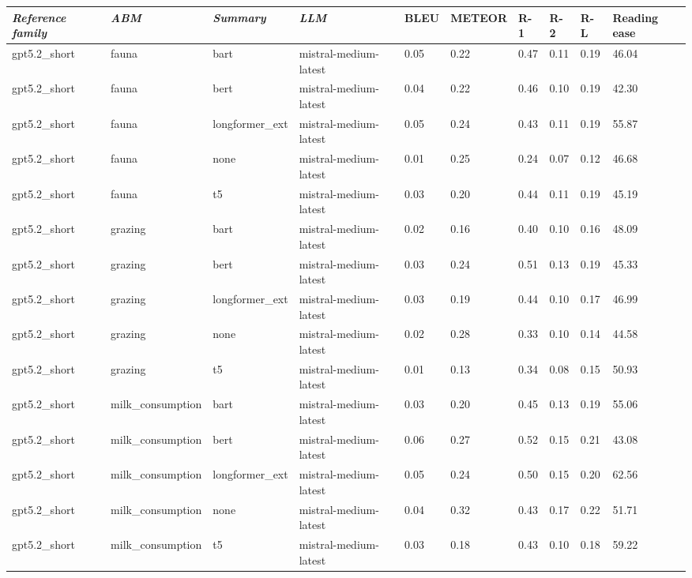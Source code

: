 \begin{tabular}{|l|l|l|l|l|l|l|l|l|l|}
\hline
\textit{\textbf{Reference family}} & \textit{\textbf{ABM}} & \textit{\textbf{Summary}} & \textit{\textbf{LLM}} & BLEU & METEOR & R-1 & R-2 & R-L & Reading ease \\
 \hline
 gpt5.2\_short & fauna & bart & mistral-medium-latest & 0.05 & 0.22 & 0.47 & 0.11 & 0.19 & 46.04 \\
 \hline
 gpt5.2\_short & fauna & bert & mistral-medium-latest & 0.04 & 0.22 & 0.46 & 0.10 & 0.19 & 42.30 \\
 \hline
 gpt5.2\_short & fauna & longformer\_ext & mistral-medium-latest & 0.05 & 0.24 & 0.43 & 0.11 & 0.19 & 55.87 \\
 \hline
 gpt5.2\_short & fauna & none & mistral-medium-latest & 0.01 & 0.25 & 0.24 & 0.07 & 0.12 & 46.68 \\
 \hline
 gpt5.2\_short & fauna & t5 & mistral-medium-latest & 0.03 & 0.20 & 0.44 & 0.11 & 0.19 & 45.19 \\
 \hline
 gpt5.2\_short & grazing & bart & mistral-medium-latest & 0.02 & 0.16 & 0.40 & 0.10 & 0.16 & 48.09 \\
 \hline
 gpt5.2\_short & grazing & bert & mistral-medium-latest & 0.03 & 0.24 & 0.51 & 0.13 & 0.19 & 45.33 \\
 \hline
 gpt5.2\_short & grazing & longformer\_ext & mistral-medium-latest & 0.03 & 0.19 & 0.44 & 0.10 & 0.17 & 46.99 \\
 \hline
 gpt5.2\_short & grazing & none & mistral-medium-latest & 0.02 & 0.28 & 0.33 & 0.10 & 0.14 & 44.58 \\
 \hline
 gpt5.2\_short & grazing & t5 & mistral-medium-latest & 0.01 & 0.13 & 0.34 & 0.08 & 0.15 & 50.93 \\
 \hline
 gpt5.2\_short & milk\_consumption & bart & mistral-medium-latest & 0.03 & 0.20 & 0.45 & 0.13 & 0.19 & 55.06 \\
 \hline
 gpt5.2\_short & milk\_consumption & bert & mistral-medium-latest & 0.06 & 0.27 & 0.52 & 0.15 & 0.21 & 43.08 \\
 \hline
 gpt5.2\_short & milk\_consumption & longformer\_ext & mistral-medium-latest & 0.05 & 0.24 & 0.50 & 0.15 & 0.20 & 62.56 \\
 \hline
 gpt5.2\_short & milk\_consumption & none & mistral-medium-latest & 0.04 & 0.32 & 0.43 & 0.17 & 0.22 & 51.71 \\
 \hline
 gpt5.2\_short & milk\_consumption & t5 & mistral-medium-latest & 0.03 & 0.18 & 0.43 & 0.10 & 0.18 & 59.22 \\
\hline
\end{tabular}
